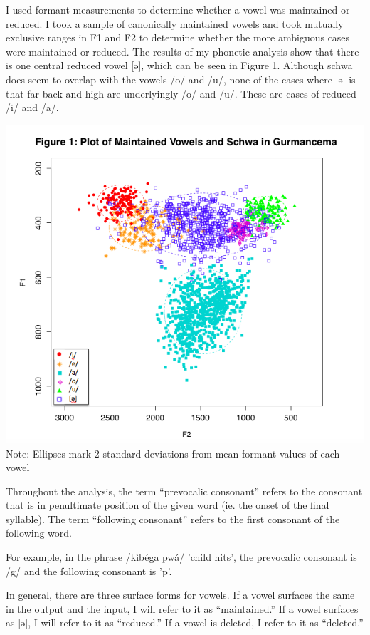 \documentclass[output=paper,
modfonts
]{langscibook}
\begin{document}
I used formant measurements to determine whether a vowel was maintained or reduced. I took a sample of canonically maintained vowels and took mutually exclusive ranges in F1 and F2 to determine whether the more ambiguous cases were maintained or reduced. The results of my phonetic analysis show that there is one central reduced vowel [ə], which can be seen in Figure 1. Although schwa does seem to overlap with the vowels /o/ and /u/, none of the cases where [ə] is that far back and high are underlyingly /o/ and /u/. These are cases of reduced /i/ and /a/.

\pagebreak

\begin{center} 
\includegraphics[width=\linewidth]{figures/ACAL_Vowel_plot.png}
  Note: Ellipses mark 2 standard deviations from mean formant values of each vowel
  \end{center}
 

Throughout the analysis, the term “prevocalic consonant” refers to the consonant that is in penultimate position of the given word (ie. the onset of the final syllable). The term “following consonant” refers to the first consonant of the following word. 

For example, in the phrase /kìbéga pwá/ 'child hits', the prevocalic consonant is /g/ and the following consonant is 'p'. 

In general, there are three surface forms for vowels. If a vowel surfaces the same in the output and the input, I will refer to it as “maintained.” If a vowel surfaces as [ə], I will refer to it as “reduced.” If a vowel is deleted, I refer to it as “deleted.”
\end{document}
